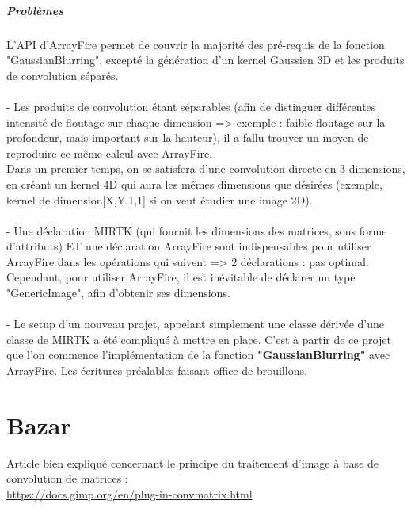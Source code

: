 \documentclass{report}
\begin{document}
\paragraph{Problèmes}
L'API d'ArrayFire permet de couvrir la majorité des pré-requis de la fonction "GaussianBlurring", excepté la génération d'un kernel Gaussien 3D et les produits de convolution séparés. \\
\\
- Les produits de convolution étant séparables (afin de distinguer différentes intensité de floutage sur chaque dimension => exemple : faible floutage sur la profondeur, mais important sur la hauteur), il a fallu trouver un moyen de reproduire ce même calcul avec ArrayFire.\\
Dans un premier temps, on se satisfera d'une convolution directe en 3 dimensions, en créant un kernel 4D qui aura les mêmes dimensions que désirées (exemple, kernel de dimension[X,Y,1,1] si on veut étudier une image 2D).\\
\\
- Une déclaration MIRTK (qui fournit les dimensions des matrices, sous forme d'attributs) ET une déclaration ArrayFire sont indispensables pour utiliser ArrayFire dans les opérations qui suivent => 2 déclarations : pas optimal. Cependant, pour utiliser ArrayFire, il est inévitable de déclarer un type "GenericImage", afin d'obtenir ses dimensions.
\\
\\
- Le setup d'un nouveau projet, appelant simplement une classe dérivée d'une classe de MIRTK a été compliqué à mettre en place. C'est à partir de ce projet que l'on commence l'implémentation de la fonction \textbf{"GaussianBlurring"} avec ArrayFire. Les écritures préalables faisant office de brouillons.

\chapter*{Bazar}
Article bien expliqué concernant le principe du traitement d'image à base de convolution de matrices : \\ 
\url{https://docs.gimp.org/en/plug-in-convmatrix.html}
\end{document}

